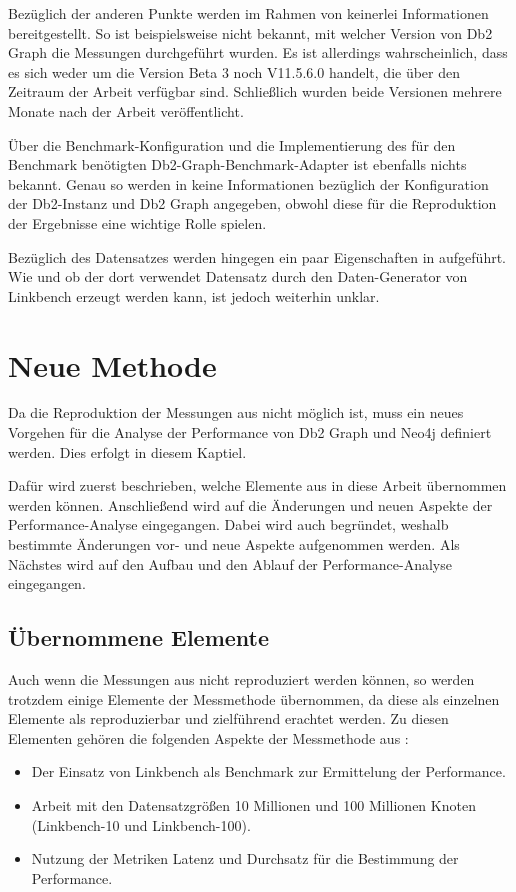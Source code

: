 Bezüglich der anderen Punkte werden im Rahmen von \cite{sigmod_tian} keinerlei Informationen bereitgestellt. So ist beispielsweise nicht bekannt, mit welcher Version von Db2 Graph die Messungen durchgeführt wurden. Es ist allerdings wahrscheinlich, dass es sich weder um die Version Beta 3 noch V11.5.6.0 handelt, die über den Zeitraum der Arbeit verfügbar sind. Schließlich wurden beide Versionen mehrere Monate nach der Arbeit veröffentlicht. 

Über die Benchmark-Konfiguration und die Implementierung des für den Benchmark benötigten Db2-Graph-Benchmark-Adapter ist ebenfalls nichts bekannt. Genau so werden in \cite{sigmod_tian} keine Informationen bezüglich der Konfiguration der Db2-Instanz und Db2 Graph angegeben, obwohl diese für die Reproduktion der Ergebnisse eine wichtige Rolle spielen. 

Bezüglich des Datensatzes werden hingegen ein paar Eigenschaften in \cite{sigmod_tian} aufgeführt. Wie und ob der dort verwendet Datensatz durch den Daten-Generator von Linkbench erzeugt werden kann, ist jedoch weiterhin unklar.

\section{Neue Methode}
Da die Reproduktion der Messungen aus \cite{sigmod_tian} nicht möglich ist, muss ein neues Vorgehen für die Analyse der Performance von Db2 Graph und Neo4j definiert werden. Dies erfolgt in diesem Kaptiel. 

Dafür wird zuerst beschrieben, welche Elemente aus \cite{sigmod_tian} in diese Arbeit übernommen werden können. Anschließend wird auf die Änderungen und neuen Aspekte der Performance-Analyse eingegangen. Dabei wird auch begründet, weshalb bestimmte Änderungen vor- und neue Aspekte aufgenommen werden. Als Nächstes wird auf den Aufbau und den Ablauf der Performance-Analyse eingegangen. 

\subsection{Übernommene Elemente}
Auch wenn die Messungen aus \cite{sigmod_tian} nicht reproduziert werden können, so werden trotzdem einige Elemente der Messmethode übernommen, da diese als einzelnen Elemente als reproduzierbar und zielführend erachtet werden. Zu diesen Elementen gehören die folgenden Aspekte der Messmethode aus \cite{sigmod_tian}:
\begin{itemize}
    \item Der Einsatz von Linkbench als Benchmark zur Ermittelung der Performance.
    \item Arbeit mit den Datensatzgrößen 10 Millionen und 100 Millionen Knoten (Linkbench-10 und Linkbench-100).
    \item Nutzung der Metriken Latenz und Durchsatz für die Bestimmung der Performance.  
\end{itemize}

